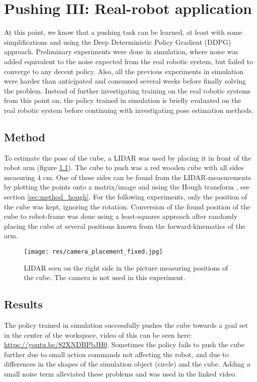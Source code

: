 \chapter{Pushing III: Real-robot application}

At this point, we know that a pushing task can be learned, at least with some
simplifications and using the Deep Deterministic Policy Gradient (DDPG)
approach. Preliminary experiments were done in simulation, where noise was
added equivalent to the noise expected from the real robotic system, but failed
to converge to any decent policy. Also, all the previous experiments in
simulation were harder than anticipated and consumed several weeks before
finally solving the problem. Instead of further investigating training on the
real robotic systems from this point on, the policy trained in simulation is
briefly evaluated on the real robotic system before continuing with
investigating pose estimation methods.

\section{Method}

To estimate the pose of the cube, a LIDAR was used by placing it in front of
the robot arm (figure \ref{fig:eef-frame}). The cube to push was a red wooden
cube with all sides measuring $4$ cm. One of these sides can be found from the
LIDAR-measurements by plotting the points onto a matrix/image and using the
Hough transform \cite{duda1972use}, see section \ref{sec:method_hough}. For the following experiments, only the
position of the cube was kept, ignoring the rotation. Conversion of the found
position of the cube to robot-frame was done using a least-squares approach
after randomly placing the cube at several positions known from the
forward-kinematics of the arm.

\begin{figure}[h!]
    \centering
    \texttt{[image: res/camera\_placement\_fixed.jpg]}

    \caption{LIDAR seen on the right side in the picture measuring positions of
    the cube. The camera is not used in this experiment.}

    \label{fig:eef-frame}
    
\end{figure}

\section{Results}

The policy trained in simulation successfully pushes the cube towards a goal
set in the center of the workspace, video of this can be seen here:
\url{https://youtu.be/82XNDBPbJH0}. Sometimes the policy fails to push the cube
further due to small action commands not affecting the robot, and due to
differences in the shapes of the simulation object (circle) and the cube.
Adding a small noise term alleviated these problems and was used in the linked
video.
